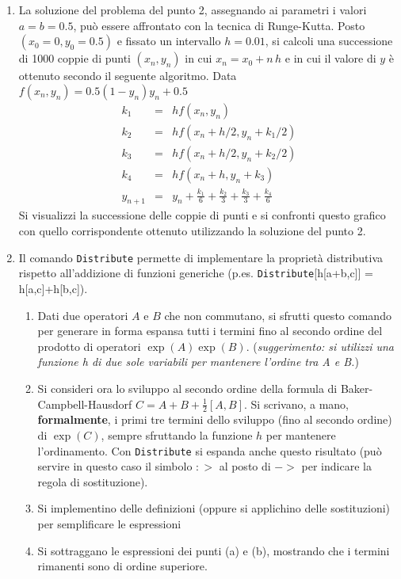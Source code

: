 \documentclass[12pt,italian]{article}
\newcommand{\bea}{\begin{eqnarray}}
\newcommand{\eea}{\end{eqnarray}}
\begin{document}
\begin{enumerate}
\item
La soluzione del problema del punto 2,
assegnando ai parametri i valori $a=b=0.5$, 
pu\`o essere affrontato con la tecnica di Runge-Kutta.
Posto $(x_0=0, y_0=0.5)$ e fissato un intervallo $h=0.01$, 
si calcoli una successione di 1000 coppie di punti $(x_n,y_n)$
in cui $x_n=x_0+ n\, h$
e in cui il valore di $y$ \`e ottenuto secondo il seguente algoritmo.
Data $f(x_n,y_n)=0.5 \left(1-y_n\right) y_n + 0.5$
\bea
k_1 &=& h f(x_n,y_n)\nonumber\\
k_2 &=& h f(x_n+h/2,y_n+k_1/2)\nonumber\\
k_3 &=& h f(x_n+h/2,y_n+k_2/2)\nonumber\\
k_4 &=& h f(x_n+h,y_n+k_3)\nonumber\\
y_{n+1} &=& y_n + \frac{k_1}{6} + \frac{k_2}{3} + \frac{k_3}{3}+ \frac{k_4}{6}
\eea
Si visualizzi la successione delle coppie di punti
e si confronti questo grafico con quello corrispondente ottenuto utilizzando la soluzione del punto 2.



\item
Il comando {\tt Distribute} permette di implementare la propriet\`a distributiva rispetto all'addizione 
di funzioni generiche (p.es. {\tt Distribute}[h[a+b,c]] = h[a,c]+h[b,c]).
\begin{enumerate}
\item
Dati due operatori $A$ e $B$ che non commutano, si sfrutti questo comando per generare in forma espansa tutti i termini fino al secondo ordine del prodotto di operatori $\exp(A) \exp(B)$.
({\it suggerimento: si utilizzi una funzione {\rm h} di due sole variabili per mantenere l'ordine tra A e B.})
\item
Si consideri ora lo sviluppo al secondo ordine della formula di Baker-Campbell-Hausdorf $C=A+B+\frac12 [A,B]$.
Si scrivano, a mano, {\bf formalmente}, i primi tre termini dello sviluppo (fino al secondo ordine)
di $\exp(C)$, sempre sfruttando la funzione $h$ per mantenere l'ordinamento.
Con {\tt Distribute} si espanda anche questo risultato (pu\`o servire in questo caso il simbolo $:>$ al posto di $->$ per indicare la regola di sostituzione).
\item
Si implementino delle definizioni (oppure si applichino delle sostituzioni) per semplificare le espressioni
\item
Si sottraggano le espressioni dei punti (a) e (b), mostrando che i termini rimanenti sono di ordine superiore.
\end{enumerate}



\end{enumerate}
\end{document}
